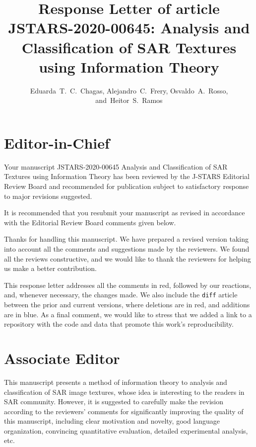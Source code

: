 \documentclass[journal,onecolumn,draftcls,11pt]{IEEEtran}
\begin{document}
\title{Response Letter of article JSTARS-2020-00645: Analysis and Classification of SAR Textures using Information Theory}

\author{Eduarda~T.~C.~Chagas,
	Alejandro~C.~Frery,
	Osvaldo~A.~Rosso,
	and~Heitor~S.~Ramos}

\maketitle

\IEEEpeerreviewmaketitle

\section{Editor-in-Chief}
\begin{tcolorbox}[colback=red!5!white,colframe=red!75!black,title=Comment \#1]
Your manuscript JSTARS-2020-00645 Analysis and Classification of SAR Textures using Information Theory has been reviewed by the J-STARS Editorial Review Board and recommended for publication subject to satisfactory response to major revisions suggested. 

It is recommended that you resubmit your manuscript as revised in accordance with the Editorial Review Board comments given below.
\end{tcolorbox}

Thanks for handling this manuscript.
We have prepared a revised version taking into account all the comments and suggestions made by the reviewers.
We found all the reviews constructive, and we would like to thank the reviewers for helping us make a better contribution.

This response letter addresses all the comments in red, followed by
our reactions, and, whenever necessary, the changes made.
We also include the \texttt{diff} article between the prior and current versions, where deletions are in red, and additions are in blue.
As a final comment, we would like to stress that we added a link to a repository with the code and data that promote this work's reproducibility.

\section{Associate Editor}
\begin{tcolorbox}[colback=red!5!white,colframe=red!75!black,title=Comment \#1]
This manuscript presents a method of information theory to analysis and classification of SAR image textures, whose idea is interesting to the readers in SAR community. However, it is suggested to carefully make the revision according to the reviewers’ comments for significantly improving the quality of this manuscript, including clear motivation and novelty, good language organization, convincing quantitative evaluation, detailed experimental analysis, etc.
\end{tcolorbox}
\end{document}
